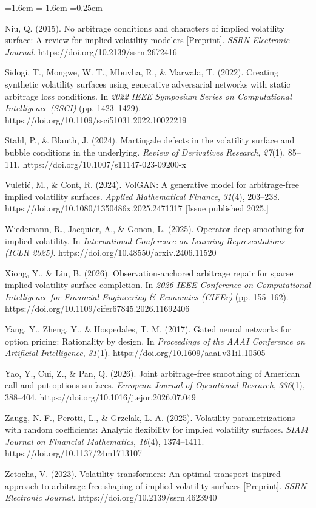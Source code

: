 \documentclass[11pt]{article}
\begin{document}
\begin{list}{}{\leftmargin=1.6em \itemindent=-1.6em \itemsep=0.25em}
\item Niu, Q. (2015). No arbitrage conditions and characters of implied volatility surface: A review for implied volatility modelers [Preprint]. \textit{SSRN Electronic Journal}. https://doi.org/10.2139/ssrn.2672416
\item Sidogi, T., Mongwe, W. T., Mbuvha, R., \& Marwala, T. (2022). Creating synthetic volatility surfaces using generative adversarial networks with static arbitrage loss conditions. In \textit{2022 IEEE Symposium Series on Computational Intelligence (SSCI)} (pp. 1423–1429). https://doi.org/10.1109/ssci51031.2022.10022219
\item Stahl, P., \& Blauth, J. (2024). Martingale defects in the volatility surface and bubble conditions in the underlying. \textit{Review of Derivatives Research}, \textit{27}(1), 85–111. https://doi.org/10.1007/s11147-023-09200-x
\item Vuletić, M., \& Cont, R. (2024). VolGAN: A generative model for arbitrage-free implied volatility surfaces. \textit{Applied Mathematical Finance}, \textit{31}(4), 203–238. https://doi.org/10.1080/1350486x.2025.2471317 [Issue published 2025.]
\item Wiedemann, R., Jacquier, A., \& Gonon, L. (2025). Operator deep smoothing for implied volatility. In \textit{International Conference on Learning Representations (ICLR 2025)}. https://doi.org/10.48550/arxiv.2406.11520
\item Xiong, Y., \& Liu, B. (2026). Observation-anchored arbitrage repair for sparse implied volatility surface completion. In \textit{2026 IEEE Conference on Computational Intelligence for Financial Engineering \& Economics (CIFEr)} (pp. 155–162). https://doi.org/10.1109/cifer67845.2026.11692406
\item Yang, Y., Zheng, Y., \& Hospedales, T. M. (2017). Gated neural networks for option pricing: Rationality by design. In \textit{Proceedings of the AAAI Conference on Artificial Intelligence}, \textit{31}(1). https://doi.org/10.1609/aaai.v31i1.10505
\item Yao, Y., Cui, Z., \& Pan, Q. (2026). Joint arbitrage-free smoothing of American call and put options surfaces. \textit{European Journal of Operational Research}, \textit{336}(1), 388–404. https://doi.org/10.1016/j.ejor.2026.07.049
\item Zaugg, N. F., Perotti, L., \& Grzelak, L. A. (2025). Volatility parametrizations with random coefficients: Analytic flexibility for implied volatility surfaces. \textit{SIAM Journal on Financial Mathematics}, \textit{16}(4), 1374–1411. https://doi.org/10.1137/24m1713107
\item Zetocha, V. (2023). Volatility transformers: An optimal transport-inspired approach to arbitrage-free shaping of implied volatility surfaces [Preprint]. \textit{SSRN Electronic Journal}. https://doi.org/10.2139/ssrn.4623940
\end{list}
\end{document}
